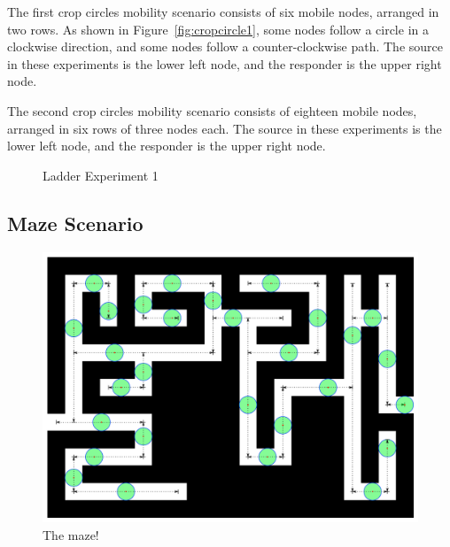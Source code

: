 The first crop circles mobility scenario consists of six mobile nodes, arranged in two rows. As shown in 
Figure~\ref{fig:cropcircle1}, some nodes follow a circle in a clockwise direction, and some nodes follow a counter-clockwise path. The source in these experiments is the lower left node, and the responder is the upper right node.



The second crop circles mobility scenario consists of eighteen mobile nodes, arranged in six rows of three nodes each. The source in these experiments is the lower left node, and the responder is the upper right node.

\begin{figure}
\begin{center}
\end{center}
\vspace{-.4cm}
\caption{Ladder Experiment 1}\label{fig:ladder1}
\vspace{-.35cm}
\end{figure}


\subsection{Maze Scenario}
\begin{figure}
\begin{center}
\includegraphics[width=.9\columnwidth]{figures/maze_diagram.pdf}
\end{center}
\caption{The maze!}
\label{fig:maze}
\end{figure}